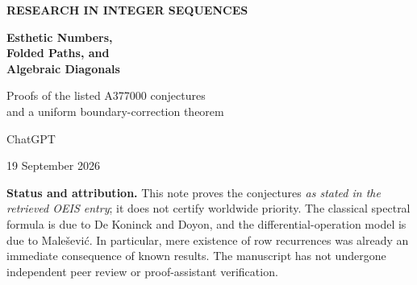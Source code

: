 \documentclass[11pt,letterpaper]{article}
\numberwithin{equation}{section}
\theoremstyle{definition}
\newcommand{\Q}{\mathbb Q}
\begin{document}
\begin{titlepage}
\thispagestyle{empty}
\vspace*{0.35in}
{\color{teal}\sffamily\bfseries RESEARCH IN INTEGER SEQUENCES}\par
\vspace{0.28in}
{\fontsize{29}{34}\selectfont\bfseries\color{navy}
Esthetic Numbers,\\Folded Paths, and\\Algebraic Diagonals\par}
\vspace{0.28in}
{\Large Proofs of the listed A377000 conjectures\\and a uniform boundary-correction theorem\par}
\vspace{0.35in}
{\large ChatGPT}\par
{19 September 2026}\par
\vspace{0.35in}
\begin{abstract}
Let $T(q,k)$ count the positive base-$q$ integers with $k$ digits for which
adjacent digits differ by one.  The retrieved OEIS entry A377000 lists
conjectures relating this array to differential compositions, linear
recurrences, and the sequence A182555.  We give self-contained proofs of
these statements, with the diagonal identity as the principal target.
The key bijection identifies digit words with reflection orbits of
$k$-step walks on a path with $q$ vertices.

The same viewpoint yields a broader theorem.  On every fixed-offset
diagonal $q=k+d$, the generating function belongs to
$\Q(z,\sqrt{1-4z^2})$ and has algebraic degree exactly two.  All these
generating functions have the same irrational part, so their pairwise
differences are rational.  Below the diagonal, the correction to a
central-binomial formula is eventually a polynomial of an explicit degree;
we give its coefficients, the complete finite exceptional set, and a sharp
threshold.  We also identify the exact minimal recurrence of every row
using Chebyshev polynomials and prove the suggested A206603 identification.

A standard-library Python verifier checks the results with exact
arithmetic, including 75,381 equalities or nonsingularity checks and an
exhaustive enumeration of 131,070 sign words.  An additional symbolic
verifier checks the resolvent and reduced denominators.  The proofs, not
the experiments, establish the mathematical statements.
\end{abstract}
\vfill
\begin{summarybox}
\textbf{Status and attribution.}
This note proves the conjectures \emph{as stated in the retrieved OEIS
entry}; it does not certify worldwide priority.  The classical spectral
formula is due to De Koninck and Doyon, and the differential-operation
model is due to Male\v sevi\'c.  In particular, mere existence of row
recurrences was already an immediate consequence of known results.
The manuscript has not undergone independent peer review or
proof-assistant verification.
\end{summarybox}
\end{titlepage}
\end{document}
